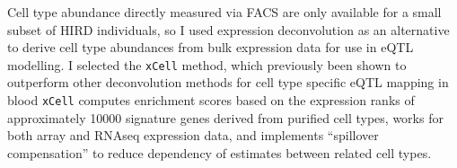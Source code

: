 Cell type abundance directly measured via \gls{FACS} are only available for a small subset of \gls{HIRD} individuals,
so I used expression deconvolution as an alternative to derive cell type abundances from bulk expression data for use in \gls{eQTL} modelling\autocite{davenport2018DiscoveringVivoCytokineeQTL,kim-hellmuth2019CellTypeSpecific}.
%
%
%
I selected the \texttt{xCell} method, which previously been shown to outperform other deconvolution methods for cell type specific \gls{eQTL} mapping in blood\autocite{kim-hellmuth2019CellTypeSpecific}
\texttt{xCell} computes enrichment scores based on the expression ranks of approximately 10000 signature genes derived from purified cell types,
works for both array and \gls{RNAseq} expression data,
and implements \enquote{spillover compensation} to reduce dependency of estimates between related cell types\autocite{aran2017XCellDigitallyPortraying}.
%
